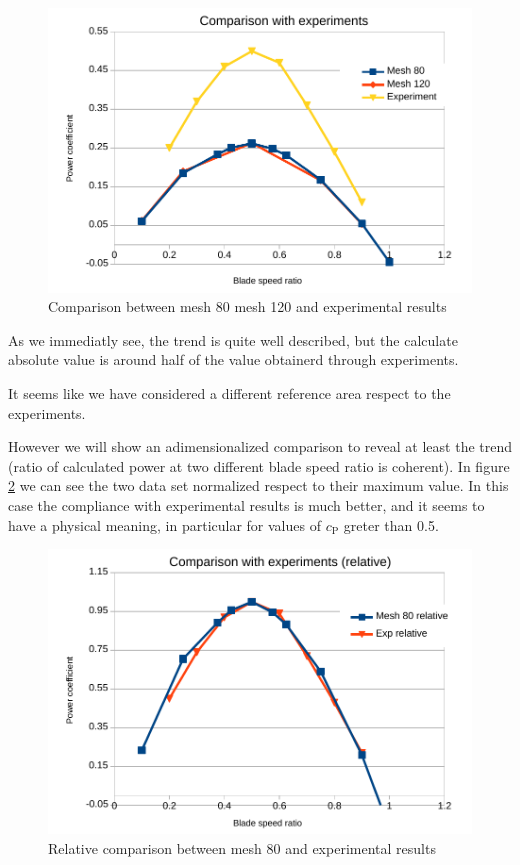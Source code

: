 \documentclass[a4paper,12pt]{article}
\begin{document}
\begin{figure}[H]
\centering
\includegraphics[width=15cm]{images/bsr/bsr-exp.pdf}
\caption{Comparison between mesh 80 mesh 120 and experimental results}
\label{fig:bsr-comparison-exp}
\end{figure}

As we immediatly see, the trend is quite well described, but the calculate absolute value is around half of the value obtainerd through experiments.

It seems like we have considered a different reference area respect to the experiments.

However we will show an adimensionalized comparison to reveal at least the trend (ratio of calculated power at two different blade speed ratio is coherent).
In figure \ref{fig:bsr-comparison-exp-relative} we can see the two data set normalized respect to their maximum value.
In this case the compliance with experimental results is much better, and it seems to have a physical meaning, in particular for values of $c_\text{P}$ greter than 0.5.

\begin{figure}[H]
\centering
\includegraphics[width=15cm]{images/bsr/bsr-exp-relative.pdf}
\caption{Relative comparison between mesh 80 and experimental results}
\label{fig:bsr-comparison-exp-relative}
\end{figure}
\end{document}
